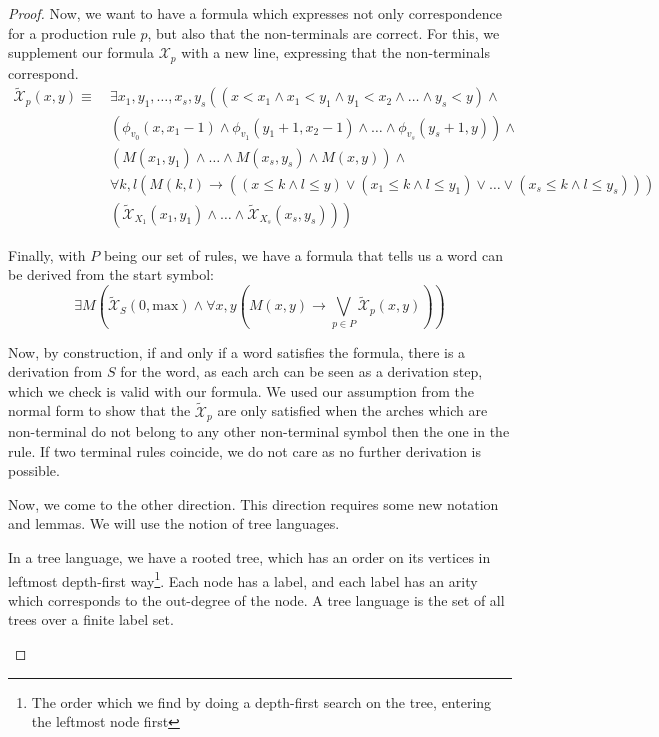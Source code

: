 \begin{proof}
    Now, we want to have a formula which expresses not only correspondence for a production rule $p$, but also that the non-terminals are correct.
    For this, we supplement our formula $\mathcal{X}_p$ with a new line, expressing that the non-terminals correspond.
    \begin{align*}
        \widetilde{\mathcal{X}}_p(x, y) \equiv~&\exists x_1, y_1, \dots, x_s, y_s \left(\left(x < x_1 \land x_1 < y_1 \land y_1 < x_2 \land \dots \land y_s < y \right) \land \right. \\
        &\left. \left(\phi_{v_0}(x, x_1 - 1) \land \phi_{v_1}(y_1 + 1, x_2 - 1) \land \dots \land \phi_{v_s}(y_s + 1, y)\right) \land \right. \\
        &\left. \left(M(x_1, y_1) \land \dots \land M(x_s, y_s) \land M(x, y) \right) \land \right. \\
        &\left. \forall k, l \left(M(k, l) \to \left((x \leq k \land l \leq y) \lor (x_1 \leq k \land l \leq y_1) \lor \dots \lor (x_s \leq k \land l \leq y_s)\right)\right) \right. \\
        &\left. \left(\widetilde{\mathcal{X}}_{X_1}(x_1, y_1) \land \dots \land \widetilde{\mathcal{X}}_{X_s}(x_s, y_s)\right)\right)
    \end{align*}

    Finally, with $P$ being our set of rules, we have a formula that tells us a word can be derived from the start symbol:
    \[
        \exists M \left(\widetilde{\mathcal{X}}_S(0, \text{max}) \land \forall x, y \left(M(x, y) \to \bigvee_{p \in P} \widetilde{\mathcal{X}}_p(x, y) \right) \right)
    \]

    Now, by construction, if and only if a word satisfies the formula, there is a derivation from $S$ for the word, as each arch can be seen as a derivation step, which we check is valid with our formula.
    We used our assumption from the normal form to show that the $\widetilde{\mathcal{X}}_p$ are only satisfied when the arches which are non-terminal do not belong to any other non-terminal symbol then the one in the rule.
    If two terminal rules coincide, we do not care as no further derivation is possible.

    \vspace{5mm}

    Now, we come to the other direction.
    This direction requires some new notation and lemmas.
    We will use the notion of tree languages.
    \begin{define}
        In a tree language, we have a rooted tree, which has an order on its vertices in leftmost depth-first way\footnote{The order which we find by doing a depth-first search on the tree, entering the leftmost node first}.
        Each node has a label, and each label has an arity which corresponds to the out-degree of the node.
        A tree language is the set of all trees over a finite label set.


\end{define}
\end{proof}
